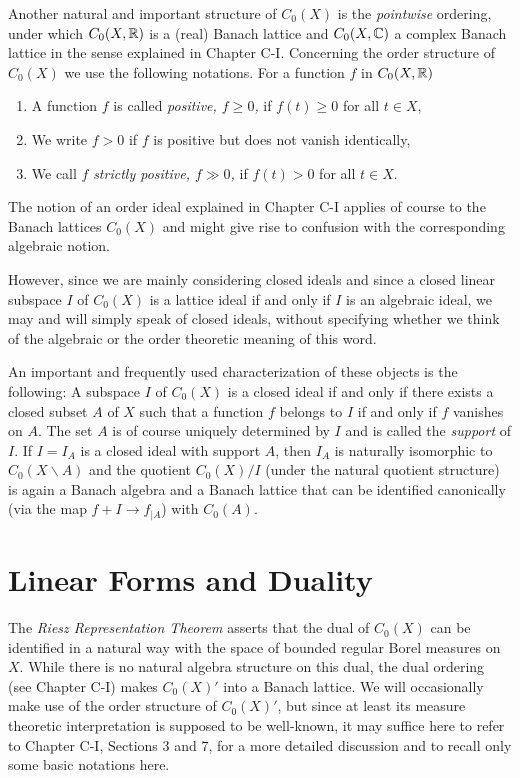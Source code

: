 Another natural and important structure of $C_{0}(X)$ is the \emph{pointwise} ordering, under which $C_{0}(X,\mathbb{R})$ is a (real) Banach lattice and $C_{0}(X,\mathbb{C})$ a complex Banach lattice in the sense explained in Chapter C-I.
Concerning the order structure of $C_{0}(X)$ we use the following notations.
For a function $f$ in $C_{0}(X,\mathbb{R})$
\begin{enumerate}[\upshape (i), labelindent=.5em]
\item
A function $ f $ is called \emph{positive, $ f \geq 0 $,} if $ f(t) \geq 0  $ for all $ t \in X $, 

\item
We write $  f > 0 $ if $ f $ is positive but does not vanish identically,

\item
We call $ f $ \emph{strictly positive, $f \gg 0$,}  if $ f(t) > 0 $ for all $ t \in X $.

\end{enumerate}
The notion of an order ideal explained in Chapter C-I applies of course to the Banach lattices $C_{0}(X)$ and might give rise to confusion with the corresponding algebraic notion.

However, since we are mainly considering closed ideals and since a closed linear subspace $I$ of $C_{0}(X)$ is a lattice ideal if and only if $I$ is an algebraic ideal, we may and will simply speak of closed ideals, without specifying whether we think of the algebraic or the order theoretic meaning of this word.

An important and frequently used characterization of these objects is the following: A subspace $I$ of $C_{0}(X)$ is a closed ideal if and only if there exists a closed subset $A$ of $X$ such that a function $f$ belongs to $I$ if and only if $f$ vanishes on $A$.
The set $A$ is of course uniquely determined by $I$ and is called the \emph{support} of $I$.
If $I = I_{A}$ is a closed ideal with support $A$, then $I_{A}$ is naturally isomorphic to $C_{0}(X\backslash A)$ and the quotient $C_{0}(X)/I$ (under the natural quotient structure) is again a Banach algebra and a Banach lattice that can be identified canonically (via the map $f + I \to f_{|A}$) with $C_{0}(A)$.
\section{Linear Forms and Duality}\label{sec:b1-2}
The \emph{Riesz Representation Theorem} asserts that the dual of $C_{0}(X)$ can be identified in a natural way with the space of bounded regular Borel measures on $X$.
While there is no natural algebra structure on this dual, the dual ordering (see Chapter C-I) makes $C_{0}(X)'$ into a Banach lattice.
We will occasionally make use of the order structure of $C_{0}(X)'$, but since at least its measure theoretic interpretation is supposed to be well-known, it may suffice here to refer to Chapter C-I, Sections 3 and 7, for a more detailed discussion and to recall only some basic notations here.

